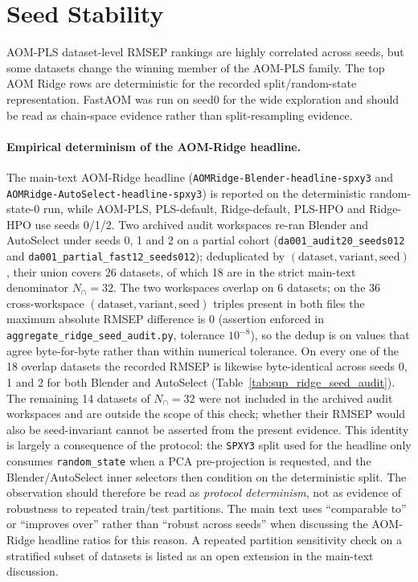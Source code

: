 \documentclass[11pt,a4paper]{article}
\newcommand{\code}[1]{\nolinkurl{#1}}
\begin{document}
\section{Seed Stability}

\begin{table}[h]
\centering
\caption{Seed-stability diagnostics for the multi-seed AOM-PLS and AOM-Ridge
runs.}
\label{tab:sup_seed_stability}
\small

\end{table}

AOM-PLS dataset-level RMSEP rankings are highly correlated across seeds, but
some datasets change the winning member of the AOM-PLS family.  The top AOM
Ridge rows are deterministic for the recorded split/random-state
representation.  FastAOM was run on seed0 for the wide exploration and
should be read as chain-space evidence rather than split-resampling evidence.

\paragraph{Empirical determinism of the AOM-Ridge headline.}
The main-text AOM-Ridge headline
(\code{AOMRidge-Blender-headline-spxy3} and
\code{AOMRidge-AutoSelect-headline-spxy3}) is reported on the deterministic
random-state-0 run, while AOM-PLS, PLS-default, Ridge-default, PLS-HPO and
Ridge-HPO use seeds 0/1/2.  Two archived audit workspaces re-ran Blender and
AutoSelect under seeds 0, 1 and 2 on a partial cohort
(\code{da001\_audit20\_seeds012} and
\code{da001\_partial\_fast12\_seeds012}); deduplicated by
$(\text{dataset},\text{variant},\text{seed})$, their union covers 26
datasets, of which 18 are in the strict main-text denominator $N_{\cap}=32$.
The two workspaces overlap on 6 datasets; on the 36 cross-workspace
$(\text{dataset},\text{variant},\text{seed})$ triples present in both files
the maximum absolute RMSEP difference is $0$ (assertion enforced in
\code{aggregate\_ridge\_seed\_audit.py}, tolerance $10^{-8}$), so the
dedup is on values that agree byte-for-byte rather than within numerical
tolerance.  On every one of the 18 overlap datasets the recorded RMSEP is
likewise byte-identical across seeds 0, 1 and 2 for both Blender and
AutoSelect (Table~\ref{tab:sup_ridge_seed_audit}).  The remaining 14
datasets of $N_{\cap}=32$ were not included in the archived audit workspaces
and are outside the scope of this check; whether their RMSEP would also be
seed-invariant cannot be asserted from the present evidence.  This identity is largely a
consequence of the protocol: the \code{SPXY3} split used for the headline
only consumes \code{random\_state} when a PCA pre-projection is requested,
and the Blender/AutoSelect inner selectors then condition on the
deterministic split.  The observation should therefore be read as
\emph{protocol determinism}, not as evidence of robustness to repeated
train/test partitions.  The main text uses ``comparable to'' or ``improves
over'' rather than ``robust across seeds'' when discussing the AOM-Ridge
headline ratios for this reason.  A repeated partition sensitivity check on a
stratified subset of datasets is listed as an open extension in the main-text
discussion.
\end{document}
